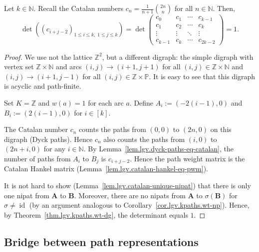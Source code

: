 \begin{corollary}
\label{cor.lgv.catalan-hankel-det-0}
\leantarget
\leanok
Let $k \in \mathbb{N}$.  Recall the Catalan numbers
$c_n = \frac{1}{n+1}\binom{2n}{n}$ for all $n \in \mathbb{N}$.  Then,
\[
  \det\!\left(\left(c_{i+j-2}\right)_{1 \le i \le k,\; 1 \le j \le k}\right)
  = \det\!\begin{pmatrix}
    c_0    & c_1    & \cdots & c_{k-1} \\
    c_1    & c_2    & \cdots & c_k     \\
    \vdots & \vdots & \ddots & \vdots  \\
    c_{k-1}& c_k    & \cdots & c_{2k-2}
  \end{pmatrix}
  = 1.
\]
\end{corollary}

\begin{proof}
We use not the lattice $\mathbb{Z}^2$, but a different digraph: the
simple digraph with vertex set $\mathbb{Z} \times \mathbb{N}$ and arcs
$(i,j) \to (i+1, j+1)$ for all $(i,j) \in \mathbb{Z} \times \mathbb{N}$
and $(i,j) \to (i+1, j-1)$ for all $(i,j) \in \mathbb{Z} \times \mathbb{P}$.
It is easy to see that this digraph is acyclic and path-finite.

Set $K = \mathbb{Z}$ and $w(a) = 1$ for each arc $a$.  Define
$A_i := (-2(i-1), 0)$ and $B_i := (2(i-1), 0)$ for $i \in [k]$.

The Catalan number $c_n$ counts the paths from $(0,0)$ to $(2n,0)$ on
this digraph (Dyck paths).  Hence $c_n$ also counts the paths from
$(i,0)$ to $(2n+i, 0)$ for any $i \in \mathbb{N}$.  By
Lemma~\ref{lem.lgv.dyck-paths-eq-catalan}, the number of paths from
$A_i$ to $B_j$ is $c_{i+j-2}$.  Hence the path weight matrix is the
Catalan Hankel matrix
(Lemma~\ref{lem.lgv.catalan-hankel-eq-pwm}).

It is not hard to show (Lemma~\ref{lem.lgv.catalan-unique-nipat}) that
there is only one nipat from $\mathbf{A}$ to $\mathbf{B}$.  Moreover,
there are no nipats from $\mathbf{A}$ to $\sigma(\mathbf{B})$ for
$\sigma \ne \operatorname{id}$ (by an argument analogous to
Corollary~\ref{cor.lgv.kpaths.wt-np}).  Hence, by
Theorem~\ref{thm.lgv.kpaths.wt-dg}, the determinant equals $1$.
\end{proof}

\subsection{Bridge between path representations}

